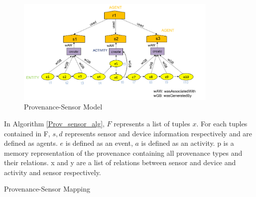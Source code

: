 \documentclass[conference]{IEEEtran}
\begin{document}
\begin{figure}[h!]
\begin{center}

\includegraphics[width=3.8in]{prov_sensor_5.PNG}
\end{center}
\caption{Provenance-Sensor Model }
\label{prov_sensor}
\end{figure}



In Algorithm \ref{Prov_sensor_alg}, $F$  represents a  list of tuples $x$. For each tuples contained in F, $s, d$ represents sensor and device information respectively and are defined as agents. $e$ is defined as an event, $a$ is defined as an activity. p is a memory representation of the provenance containing all  provenance types and their relations. x and y are a list of relations between sensor and device and activity and sensor respectively.

\begin{algorithm}[tb]
\caption{Provenance-Sensor Mapping}
\label{Prov_sensor_alg}

\end{algorithm}
\end{document}

